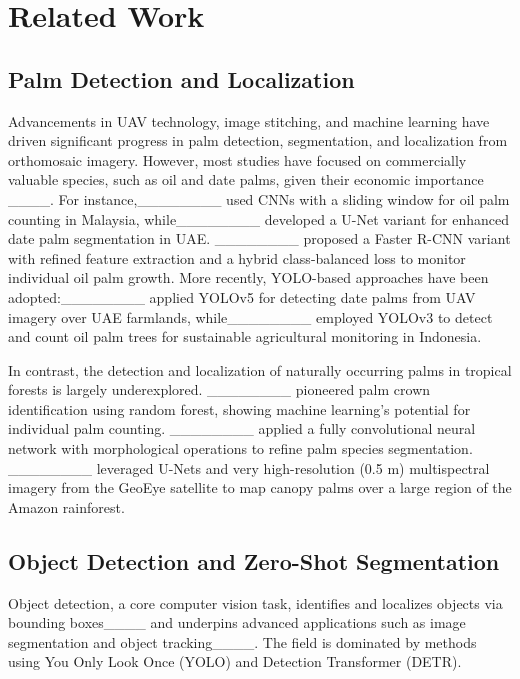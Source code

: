 \section{Related Work}
\label{sec:related}


\subsection{Palm Detection and Localization}

Advancements in UAV technology, image stitching, and machine learning have driven significant progress in palm detection, segmentation, and localization from orthomosaic imagery. However, most studies have focused on commercially valuable species, such as oil and date palms, given their economic importance ____. For instance,________ used CNNs with a sliding window for oil palm counting in Malaysia, while________ developed a U-Net variant for enhanced date palm segmentation in UAE. ________ proposed a Faster R-CNN variant with refined feature extraction and a hybrid class-balanced loss to monitor individual oil palm growth. More recently, YOLO-based approaches have been adopted:________ applied YOLOv5 for detecting date palms from UAV imagery over UAE farmlands, while________ employed YOLOv3 to detect and count oil palm trees for sustainable agricultural monitoring in Indonesia.

In contrast, the detection and localization of naturally occurring palms in tropical forests is largely underexplored. ________ pioneered palm crown identification using random forest, showing machine learning’s potential for individual palm counting. ________ applied a fully convolutional neural network with morphological operations to refine palm species segmentation. ________ leveraged U-Nets and very high-resolution (0.5 m) multispectral imagery from the GeoEye satellite to map canopy palms over a large region of the Amazon rainforest.

\subsection{Object Detection and Zero-Shot Segmentation}
\label{sec:object}

Object detection, a core computer vision task, identifies and localizes objects via bounding boxes____ and underpins advanced applications such as image segmentation and object tracking____. The field is dominated by methods using You Only Look Once (YOLO) and Detection Transformer (DETR). 

